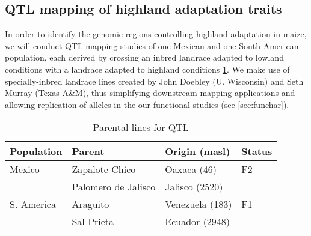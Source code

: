 \subsection{QTL mapping of highland adaptation traits}

In order to identify the genomic regions controlling highland adaptation in maize, we will conduct QTL mapping studies of one Mexican and one South American population, each derived by crossing an inbred landrace adapted to lowland conditions with a landrace adapted to highland conditions \ref{tab:qtlpops}.  We make use of specially-inbred landrace lines created by John Doebley (U. Wisconsin) and Seth Murray (Texas A\&M), thus simplifying downstream mapping applications and allowing replication of alleles in the our functional studies (see \ref{sec:funchar}). 

\begin{table}
\begin{center}
\caption{Parental lines for QTL} \label{tab:qtlpops}
\begin{tabular}{llll}\\\toprule  
{\bf Population}	& {\bf Parent } &	{\bf Origin (masl)} & {\bf Status }\\ \midrule
 \rowcolor{gray!25}
Mexico	& Zapalote Chico		& Oaxaca	 (46)		&  F2 \\ 
 \rowcolor{gray!25}
	& 	Palomero de Jalisco	& 	Jalisco (2520)		& \\
S. America	& Araguito	& Venezuela (183)	&  F1 \\ 
	& Sal Prieta	 & Ecuador (2948) & \\ \bottomrule
\end{tabular}
\end{center}
\end{table} 

